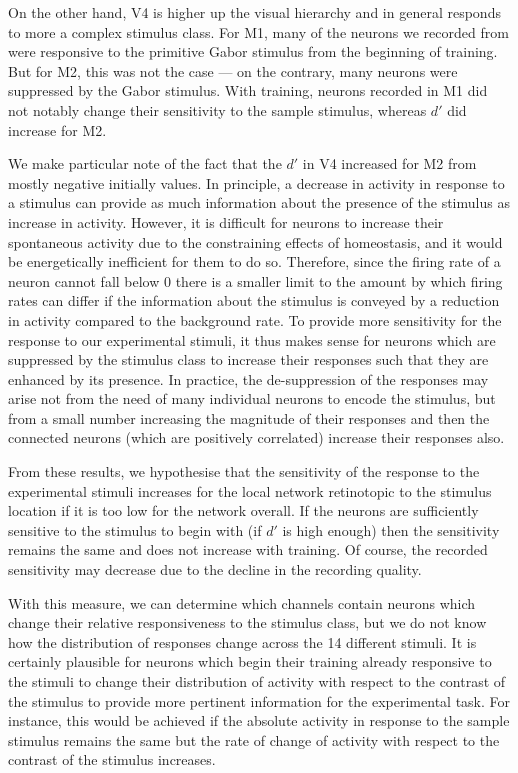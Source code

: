 On the other hand, \ac{V4} is higher up the visual hierarchy and in general responds to more a complex stimulus class.
For \ac{M1}, many of the neurons we recorded from were responsive to the primitive Gabor stimulus from the beginning of training.
But for \ac{M2}, this was not the case --- on the contrary, many neurons were suppressed by the Gabor stimulus.
With training, neurons recorded in \ac{M1} did not notably change their sensitivity to the sample stimulus, whereas $d'$ did increase for \ac{M2}.

We make particular note of the fact that the $d'$ in \ac{V4} increased for \ac{M2} from mostly negative initially values.
In principle, a decrease in activity in response to a stimulus can provide as much information about the presence of the stimulus as increase in activity.
However, it is difficult for neurons to increase their spontaneous activity due to the constraining effects of homeostasis, and it would be energetically inefficient for them to do so.
Therefore, since the firing rate of a neuron cannot fall below $0$ there is a smaller limit to the amount by which firing rates can differ if the information about the stimulus is conveyed by a reduction in activity compared to the background rate.
To provide more sensitivity for the response to our experimental stimuli, it thus makes sense for neurons which are suppressed by the stimulus class to increase their responses such that they are enhanced by its presence.
In practice, the de-suppression of the responses may arise not from the need of many individual neurons to encode the stimulus, but from a small number increasing the magnitude of their responses and then the connected neurons (which are positively correlated) increase their responses also.

From these results, we hypothesise that the sensitivity of the response to the experimental stimuli increases for the local network retinotopic to the stimulus location if it is too low for the network overall.
If the neurons are sufficiently sensitive to the stimulus to begin with (if $d'$ is high enough) then the sensitivity remains the same and does not increase with training.
Of course, the recorded sensitivity may decrease due to the decline in the recording quality.

With this measure, we can determine which channels contain neurons which change their relative responsiveness to the stimulus class, but we do not know how the distribution of responses change across the 14 different stimuli.
It is certainly plausible for neurons which begin their training already responsive to the stimuli to change their distribution of activity with respect to the contrast of the stimulus to provide more pertinent information for the experimental task.
For instance, this would be achieved if the absolute activity in response to the sample stimulus remains the same but the rate of change of activity with respect to the contrast of the stimulus increases.


